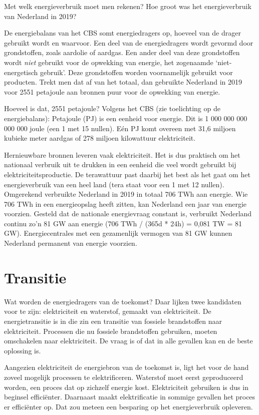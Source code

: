 \documentclass[
  11pt,
  a4paper,
]{book}
\begin{document}
Met welk energieverbruik moet men rekenen? Hoe groot was het energieverbruik van Nederland in 2019?

De energiebalans van het CBS somt energiedragers op, hoeveel van de drager gebruikt wordt en waarvoor. Een deel van de energiedragers wordt gevormd door grondstoffen, zoals aardolie of aardgas. Een ander deel van deze grondstoffen wordt \emph{niet} gebruikt voor de opwekking van energie, het zogenaamde `niet-energetisch gebruik'. Deze grondstoffen worden voornamelijk gebruikt voor producten. Trekt men dat af van het totaal, dan gebruikte Nederland in 2019 voor 2551 petajoule aan bronnen puur voor de opwekking van energie.

Hoeveel is dat, 2551 petajoule? Volgens het CBS (zie toelichting op de energiebalans): Petajoule (PJ) is een eenheid voor energie. Dit is 1 000 000 000 000 000 joule (een 1 met 15 nullen). Eén PJ komt overeen met 31,6 miljoen kubieke meter aardgas of 278 miljoen kilowattuur elektriciteit.

Hernieuwbare bronnen leveren vaak elektriciteit. Het is dus praktisch om het nationaal verbruik uit te drukken in een eenheid die veel wordt gebruikt bij elektriciteitsproductie. De terawattuur past daarbij het best als het gaat om het energieverbruik van een heel land (tera staat voor een 1 met 12 nullen). Omgerekend verbruikte Nederland in 2019 in totaal 706 TWh aan energie. Wie 706 TWh in een energieopslag heeft zitten, kan Nederland een jaar van energie voorzien. Gesteld dat de nationale energievraag constant is, verbruikt Nederland continu zo'n 81 GW aan energie (706 TWh / (365d * 24h) = 0,081 TW = 81 GW). Energiecentrales met een gezamenlijk vermogen van 81 GW kunnen Nederland permanent van energie voorzien.

\hypertarget{transitie}{%
\section{Transitie}\label{transitie}}

Wat worden de energiedragers van de toekomst? Daar lijken twee kandidaten voor te zijn: elektriciteit en waterstof, gemaakt van elektriciteit. De energietransitie is in die zin een transitie van fossiele brandstoffen naar elektriciteit. Processen die nu fossiele brandstoffen gebruiken, moeten omschakelen naar elektriciteit. De vraag is of dat in alle gevallen kan en de beste oplossing is.

Aangezien elektriciteit de energiebron van de toekomst is, ligt het voor de hand zoveel mogelijk processen te elektrificeren. Waterstof moet eerst geproduceerd worden, een proces dat op zichzelf energie kost. Elektriciteit gebruiken is dus in beginsel efficiënter. Daarnaast maakt elektrificatie in sommige gevallen het proces er efficiënter op. Dat zou meteen een besparing op het energieverbruik opleveren.
\end{document}
